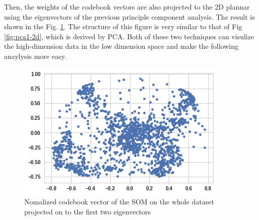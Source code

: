 \documentclass[12pt]{article}
\begin{document}
\par Then, the weights of the codebook vectors are also projected to the 2D plannar using the eigenvectors of the previous principle component analysis. The result is shown in the Fig. \ref{fig:som-weights-projection}. The structure of this figure is very similar to that of Fig \ref{fig:pca1-2d}, which is derived by PCA. Both of these two techniques can visulize the high-dimension data in the low dimension space and make the following anaylysis more easy.
\begin{figure}
    \centering
    \includegraphics[width=\textwidth]{images/som-weights-projection.png}
    \caption{Nomalized codebook vector of the SOM on the whole dataset projected on to the first two eigenvectors}
    \label{fig:som-weights-projection}
\end{figure}
\end{document}
